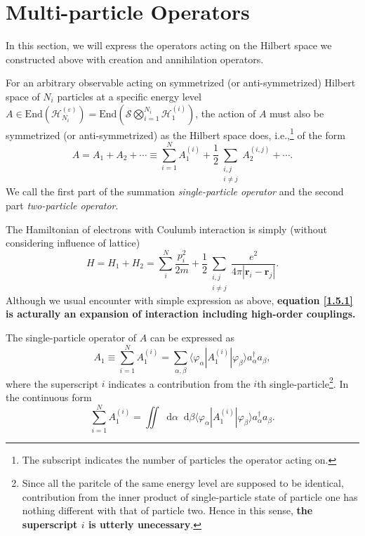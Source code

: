 \documentclass[b5paper,10pt,UTF8]{book}
\newcommand*\dd{\mathop{}\!\mathrm{d}}
\numberwithin{equation}{section}
\begin{document}
	\section{Multi-particle Operators}
		In this section, we will express the operators acting on the Hilbert space we constructed above with creation and annihilation operators. 
		\begin{Def}
			For an arbitrary observable acting on symmetrized (or anti-symmetrized) Hilbert space of $N_i$ particles at a specific energy level $A\in\mathrm{End}(\mathcal{H}_{N_i}^{(\varepsilon)})=\displaystyle\mathrm{End}\left(\mathcal{S}\bigotimes_{i=1}^{N_i}\mathcal{H}^{(i)}_1\right)$, the action of $A$ must also be symmetrized (or anti-symmetrized) as the Hilbert space does, i.e.,\footnote{The subscript indicates the number of particles the operator acting on.} of the form
			\begin{equation}\label{1.5.1}
				A=A_1+A_2+\cdots\equiv\sum_{i=1}^N A^{(i)}_1+\dfrac{1}{2}\sum_{\substack{i,j\\i\neq j}}A_2^{(i,j)}+\cdots.
			\end{equation}
			We call the first part of the summation \emph{single-particle operator} and the second part \emph{two-particle operator}.
		\end{Def}
		\begin{Example}
			The Hamiltonian of electrons with Coulumb interaction is simply (without considering influence of lattice)
			$$ H=H_1+H_2=\sum_i^N\dfrac{p_i^2}{2m}+\dfrac{1}{2}\sum_{\substack{i,j\\i\neq j}}\frac{e^2}{4\pi|\bm{r}_i-\bm{r}_j|}.$$
			Although we usual encounter with simple expression as above, \textbf{equation \eqref{1.5.1} is acturally an expansion of interaction including high-order couplings.}
		\end{Example}
		\begin{Proposition}
			The single-particle operator of $A$ can be expressed as
			\begin{equation}\label{1.5.2}
				A_1\equiv\sum_{i=1}^N A^{(i)}_1=\sum_{\alpha,\beta}\langle\varphi_\alpha|A_1^{(i)}|\varphi_\beta\rangle a_\alpha^\dagger a_\beta,
			\end{equation}
			where the superscript $i$ indicates a contribution from the $i$th single-particle\footnote{Since all the paritcle of the same energy level are supposed to be identical, contribution from the inner product of single-particle state of particle one has nothing different with that of particle two. Hence in this sense, \textbf{the superscript $i$ is utterly unecessary}.}. In the continuous form
			$$\sum_{i=1}^N A^{(i)}_1=\iint\dd\alpha\dd\beta\langle\varphi_\alpha|A_1^{(i)}|\varphi_\beta\rangle a_\alpha^\dagger a_\beta.$$
		\end{Proposition}
\end{document}
